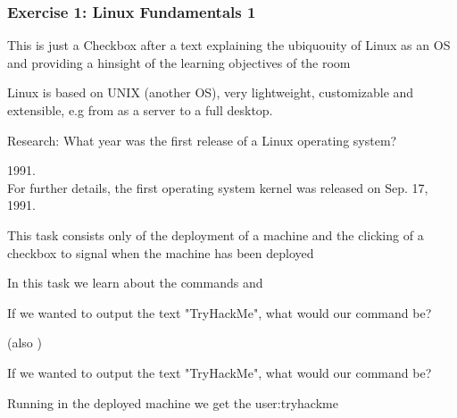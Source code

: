 \subsubsection*{Exercise 1: Linux Fundamentals 1}
\begin{task}[Introduction]
This is just a Checkbox after a text explaining the ubiquouity of Linux as an OS and providing a hinsight of the learning objectives of the room
\end{task}

\begin{task}
Linux is based on UNIX (another OS), very lightweight, customizable and extensible, e.g from as a server to a full desktop.
\begin{question}
Research: What year was the first release of a Linux operating system?
\end{question}
\begin{answer}
1991.\\
For further details, the first operating system kernel was released on Sep. 17, 1991.
\end{answer}
\end{task}

\begin{task}
This task consists only of the deployment of a machine and the clicking of a checkbox to signal when the machine has been deployed
\end{task}

\begin{task}
In this task we learn about the commands  and 
\begin{question}
If we wanted to output the text "TryHackMe", what would our command be?
\end{question}
\begin{answer}
 (also )
\end{answer}
\begin{question}
If we wanted to output the text "TryHackMe", what would our command be?
\end{question}
\begin{answer}
Running  in the deployed machine we get the user:tryhackme
\end{answer}
\end{task}

